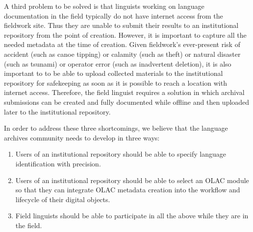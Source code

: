 A third problem to be solved is that linguists working
on language documentation in the field typically do not have internet access from
the fieldwork site. Thus they are unable to submit their
results to an institutional repository from the point of creation.
However, it is important to capture all the needed metadata at the time
of  creation.  Given fieldwork's ever-present risk of accident (such as
canoe tipping) or calamity (such as theft) or natural disaster (such
as tsunami) or operator error (such as inadvertent deletion), it is
also important to to be able to upload
collected materials to the institutional repository for safekeeping
as soon as it is possible to reach a location with internet access.
Therefore, the field linguist requires a solution in which archival
submissions can be created and fully documented while offline and then
uploaded later to the institutional repository.


In order to address these three shortcomings, we believe that the
language archives community needs to develop in three ways:

\begin{enumerate}\setlength{\itemsep}{0pt}
\item Users of an institutional repository should be able
  to specify language identification with precision.

\item Users of an institutional repository should be
    able to select an OLAC module so that they can integrate OLAC
    metadata creation into the workflow and lifecycle of their
    digital objects.

\item Field linguists should be able to participate in all the
    above while they are in the field.
\end{enumerate}


